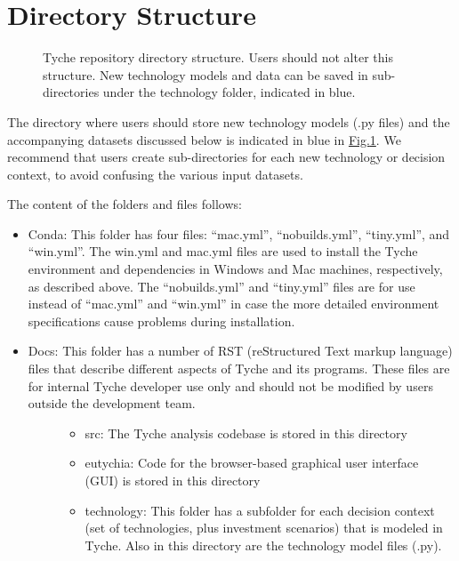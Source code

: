 \documentclass[letterpaper,10pt,english]{sphinxmanual}
\let\sphinxpxdimen\pdfpxdimen\else\newdimen\sphinxpxdimen
\begin{document}
\section{Directory Structure}
\label{\detokenize{cheat-sheet:directory-structure}}
\begin{figure}[htbp]
\centering
\capstart

\noindent\sphinxincludegraphics[width=400\sphinxpxdimen]{{image1}.png}
\caption{Tyche repository directory structure. Users should not alter this structure. New technology models and data can be saved in sub-directories under the technology folder, indicated in blue.}\label{\detokenize{cheat-sheet:figure-1}}\label{\detokenize{cheat-sheet:fig-directorystruct}}\end{figure}

The directory where users should store new technology models (.py files) and the accompanying datasets discussed below is indicated in blue in \hyperref[\detokenize{cheat-sheet:fig-directorystruct}]{Fig.\@ \ref{\detokenize{cheat-sheet:fig-directorystruct}}}. We recommend that users create sub-directories for each new technology or decision context, to avoid confusing the various input datasets.

The content of the folders and files follows:
\begin{itemize}
\item {} 
Conda: This folder has four files: “mac.yml”, “nobuilds.yml”, “tiny.yml”, and “win.yml”.  The win.yml and mac.yml files are used to install the Tyche environment and dependencies in Windows and Mac machines, respectively, as described above.  The “nobuilds.yml” and “tiny.yml” files are for use instead of “mac.yml” and “win.yml” in case the more detailed environment specifications cause problems during installation.

\item {} \begin{description}
\item[{Docs: This folder has a number of RST (reStructured Text markup language) files that describe different aspects of Tyche and its programs.  These files are for internal Tyche developer use only and should not be modified by users outside the development team.}] \leavevmode\begin{itemize}
\item {} 
src: The Tyche analysis codebase is stored in this directory

\item {} 
eutychia: Code for the browser-based graphical user interface (GUI) is stored in this directory

\item {} 
technology: This folder has a subfolder for each decision context (set of technologies, plus investment scenarios) that is modeled in Tyche. Also in this directory are the technology model files (.py).

\end{itemize}

\end{description}

\end{itemize}
\end{document}
